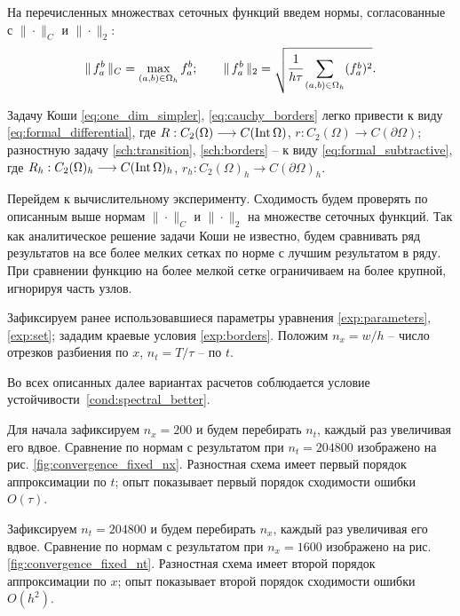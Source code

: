 На перечисленных множествах сеточных функций введем нормы, согласованные с $\| \cdot \|_C$ и $\| \cdot \|_2$:
$$\| \, f_a^b \, \|_C = \max \limits_{(a, b) \in \Omega_h} f_a^b; \qquad \| \, f_a^b \, \|_2 = \sqrt{\cfrac{1}{h \tau}\sum \limits_{(a, b) \in \Omega_h} (f_a^b)^2} {\text{.}}$$

Задачу Коши \eqref{eq:one_dim_simpler}, \eqref{eq:cauchy_borders} легко привести к виду \eqref{eq:formal_differential}, где $R: C_2(\Omega) \longrightarrow C(\operatorname{{Int}} \Omega)$, $r: C_2(\Omega) \longrightarrow C(\partial \Omega)$; разностную задачу \eqref{sch:transition}, \eqref{sch:borders} -- к виду \eqref{eq:formal_subtractive}, где $R_h: C_2(\Omega)_h \longrightarrow C(\operatorname{{Int}} \Omega)_h$, $r_h: C_2(\Omega)_h \longrightarrow C(\partial \Omega)_h$.

Перейдем к вычислительному эксперименту. Сходимость будем проверять по описанным выше нормам $\| \cdot \|_C$ и $\| \cdot \|_2$ на множестве сеточных функций. Так как аналитическое решение задачи Коши не известно, будем сравнивать ряд результатов на все более мелких сетках по норме с лучшим результатом в ряду. При сравнении функцию на более мелкой сетке ограничиваем на более крупной, игнорируя часть узлов.

Зафиксируем ранее использовавшиеся параметры уравнения \eqref{exp:parameters}, \eqref{exp:set}; зададим краевые условия \eqref{exp:borders}. Положим $n_x = w / h$ -- число отрезков разбиения по $x$, $n_t = T / \tau$ -- по $t$.

Во всех описанных далее вариантах расчетов соблюдается условие устойчивости~\eqref{cond:spectral_better}.

Для начала зафиксируем $n_x = 200$ и будем перебирать $n_t$, каждый раз увеличивая его вдвое. Сравнение по нормам с результатом при $n_t = 204800$ изображено на рис. \ref{fig:convergence_fixed_nx}. Разностная схема имеет первый порядок аппроксимации по $t$; опыт показывает первый порядок сходимости ошибки $O(\tau)$.

Зафиксируем $n_t = 204800$ и будем перебирать $n_x$, каждый раз увеличивая его вдвое. Сравнение по нормам с результатом при $n_x = 1600$ изображено на рис. \ref{fig:convergence_fixed_nt}. Разностная схема имеет второй порядок аппроксимации по $x$; опыт показывает второй порядок сходимости ошибки $O(h^2)$.

